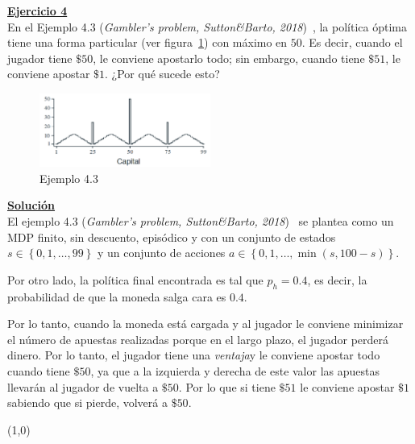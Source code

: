 \indent\underline{\textbf{Ejercicio 4}}\\
En el Ejemplo 4.3 (\textit{Gambler’s problem, Sutton\&Barto, 2018})~\cite{Sutton2018}, la política óptima tiene una forma particular (ver figura~\ref{fig:gamblers_problem}) con máximo en $50$.
Es decir, cuando el jugador tiene $\$50$, le conviene apostarlo todo; sin embargo, cuando tiene $\$51$, le conviene apostar $\$1$.
¿Por qué sucede esto?

\begin{figure}[H]
    \centering
    \includegraphics[width=0.5\textwidth]{../img/gamblers_problem}
    \caption{Ejemplo 4.3~\cite{Sutton2018}}
    \label{fig:gamblers_problem}
\end{figure}

\indent\underline{\textbf{Solución}}\\
El ejemplo 4.3 (\textit{Gambler’s problem, Sutton\&Barto, 2018})~\cite{Sutton2018} se plantea como un MDP finito, sin descuento, episódico y con un conjunto de estados $s \in \left\{0, 1, \ldots, 99\right\}$ y un conjunto de acciones $a \in \left\{0, 1, \ldots, \min(s, 100-s)\right\}$.

Por otro lado, la política final encontrada es tal que $p_h=0.4$, es decir, la probabilidad de que la moneda salga cara es $0.4$.

Por lo tanto, cuando la moneda está cargada y al jugador le conviene minimizar el número de apuestas realizadas porque en el largo plazo, el jugador perderá dinero.
Por lo tanto, el jugador tiene una \textit{ventaja}\footnotemark y le conviene apostar todo cuando tiene $\$50$, ya que a la izquierda y derecha de este valor las apuestas llevarán al jugador de vuelta a $\$50$.
Por lo que si tiene $\$51$ le conviene apostar $\$1$ sabiendo que si pierde, volverá a $\$50$.

\line(1,0){\textwidth}
